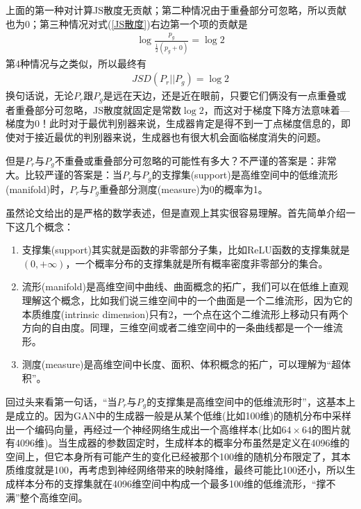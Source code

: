             \par
            上面的第一种对计算JS散度无贡献；第二种情况由于重叠部分可忽略，所以贡献也为0；第三种情况对式(\ref{JS散度})右边第一个项的贡献是
            \begin{align*}
            \log \frac{p_g}{\frac{1}{2}(p_g+0)} = \log 2
            \end{align*}
            第4种情况与之类似，所以最终有
            \begin{align*}
            JSD(P_r||P_g) = \log 2
            \end{align*}
            换句话说，无论$ P_r $跟$ P_g $是远在天边，还是近在眼前，只要它们俩没有一点重叠或者重叠部分可忽略，JS散度就固定是常数$\log 2$，而这对于梯度下降方法意味着—梯度为0！此时对于最优判别器来说，生成器肯定是得不到一丁点梯度信息的，即使对于接近最优的判别器来说，生成器也有很大机会面临梯度消失的问题。
            \par
            但是$ P_r $与$ P_g $不重叠或重叠部分可忽略的可能性有多大？不严谨的答案是：非常大。比较严谨的答案是：当$ P_r $与$ P_g $的支撑集(support)是高维空间中的低维流形(manifold)时，$P_r $与$ P_g $重叠部分测度(measure)为0的概率为1。
            \par
            虽然论文给出的是严格的数学表述，但是直观上其实很容易理解。首先简单介绍一下这几个概念：
            \begin{enumerate}
            \item 支撑集(support)其实就是函数的非零部分子集，比如ReLU函数的支撑集就是$(0,+\infty)$，一个概率分布的支撑集就是所有概率密度非零部分的集合。
            \item 流形(manifold)是高维空间中曲线、曲面概念的拓广，我们可以在低维上直观理解这个概念，比如我们说三维空间中的一个曲面是一个二维流形，因为它的本质维度(intrinsic dimension)只有2，一个点在这个二维流形上移动只有两个方向的自由度。同理，三维空间或者二维空间中的一条曲线都是一个一维流形。
            \item 测度(measure)是高维空间中长度、面积、体积概念的拓广，可以理解为“超体积”。
            \end{enumerate}
            \par
            回过头来看第一句话，“当$ P_r $与$ P_g $的支撑集是高维空间中的低维流形时”，这基本上是成立的。因为GAN中的生成器一般是从某个低维(比如100维)的随机分布中采样出一个编码向量，再经过一个神经网络生成出一个高维样本(比如$64\times 64$的图片就有4096维)。当生成器的参数固定时，生成样本的概率分布虽然是定义在4096维的空间上，但它本身所有可能产生的变化已经被那个100维的随机分布限定了，其本质维度就是100，再考虑到神经网络带来的映射降维，最终可能比100还小，所以生成样本分布的支撑集就在4096维空间中构成一个最多100维的低维流形，“撑不满”整个高维空间。
